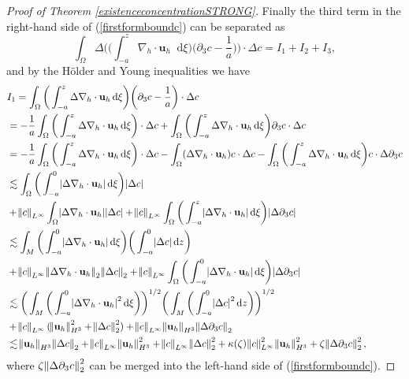 \documentclass[12pt]{report}
\numberwithin{theorem}{chapter}
\numberwithin{corollary}{chapter}
\numberwithin{lemma}{chapter}
\numberwithin{remark}{chapter}
\numberwithin{definition}{chapter}
\numberwithin{prop}{chapter}
\newcommand*\diff{\mathop{}\!\mathrm{d}}
\begin{document}
\begin{proof}[Proof of Theorem \ref{existenceconcentrationSTRONG}]
  Finally the third term in the right-hand side of (\ref{firstformboundc}) can be separated as
%
  $$\int_\Omega \Delta \bigg ( \bigg ( \int_{-a}^z \nabla_h \cdot \mathbf{u}_h \diff \xi \bigg) \bigg ( \partial_3 c - \frac{1}{a}\bigg) \bigg ) \cdot \Delta c = I_1 + I_2 + I_3,$$
%
  and by the H\"older and Young inequalities we have
%
\begin{equation} \label{term3estimateGE_1}
  \begin{split}
    &  I_1 = \int_\Omega \bigg ( \int_{-a}^z \Delta \nabla_h \cdot \mathbf{u}_h \diff \xi \bigg) \bigg ( \partial_3 c - \frac{1}{a}\bigg)  \cdot \Delta c \\
    & = - \frac{1}{a} \int_\Omega \bigg ( \int_{-a}^z \Delta \nabla_h \cdot \mathbf{u}_h \diff \xi \bigg) \cdot \Delta c + \int_\Omega \bigg ( \int_{-a}^z \Delta \nabla_h \cdot \mathbf{u}_h \diff \xi \bigg) \partial_3 c \cdot \Delta c \\
    & = - \frac{1}{a} \int_\Omega \bigg ( \int_{-a}^z \Delta \nabla_h \cdot \mathbf{u}_h \diff \xi \bigg) \cdot \Delta c - \int_\Omega  (\Delta \nabla_h \cdot \mathbf{u}_h) c \cdot \Delta c - \int_\Omega \bigg ( \int_{-a}^z \Delta \nabla_h \cdot \mathbf{u}_h \diff \xi \bigg) c \cdot \Delta \partial_3 c \\
    & \lesssim \int_\Omega \bigg ( \int_{-a}^0 \abs{\Delta \nabla_h \cdot \mathbf{u}_h} \diff \xi \bigg) \abs{\Delta c} \\
    & + \norm{c}_{L^\infty} \int_\Omega  \abs{\Delta \nabla_h \cdot \mathbf{u}_h} \abs{\Delta c} + \norm{c}_{L^\infty} \int_\Omega \bigg ( \int_{-a}^z \abs{ \Delta \nabla_h \cdot \mathbf{u}_h} \diff \xi \bigg) \abs{\Delta \partial_3 c} \\
    & \lesssim \int_M \bigg ( \int_{-a}^0 \abs{\Delta \nabla_h \cdot \mathbf{u}_h} \diff \xi \bigg) \bigg ( \int_{-a}^0 \abs{\Delta c} \diff z \bigg ) \\
    & + \norm{c}_{L^\infty}   \norm{\Delta \nabla_h \cdot \mathbf{u}_h}_2 \norm{\Delta c}_2 + \norm{c}_{L^\infty} \int_\Omega \bigg ( \int_{-a}^0 \abs{ \Delta \nabla_h \cdot \mathbf{u}_h} \diff \xi \bigg) \abs{\Delta \partial_3 c} \\
    & \lesssim \bigg ( \int_M \bigg ( \int_{-a}^0 \abs{\Delta \nabla_h \cdot \mathbf{u}_h}^2 \diff \xi \bigg) \bigg )^{1/2} \bigg ( \int_M \bigg ( \int_{-a}^0 \abs{\Delta c}^2 \diff z \bigg ) \bigg )^{1/2} \\
    & + \norm{c}_{L^\infty} (\norm{\mathbf{u}_h}_{H^3}^2 + \norm{\Delta c}_2^2) + \norm{c}_{L^\infty} \norm{\mathbf{u}_h}_{H^3} \norm{\Delta \partial_3 c}_2 \\
    & \lesssim \norm{\mathbf{u}_h}_{H^3} \norm{\Delta c}_2 + \norm{c}_{L^\infty} \norm{\mathbf{u}_h}_{H^3}^2 + \norm{c}_{L^\infty} \norm{\Delta c}_2^2 + \kappa(\zeta) \norm{c}_{L^\infty}^2 \norm{\mathbf{u}_h}_{H^3}^2 + \zeta \norm{\Delta \partial_3 c}_2^2, \raisetag{60pt} \\
  \end{split}
\end{equation}
%
where $ \zeta \norm{\Delta \partial_3 c}_2^2$ can be merged into the left-hand side of (\ref{firstformboundc}).


\end{proof}
\end{document}
